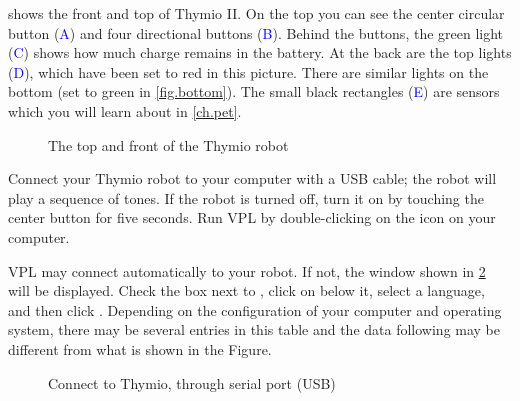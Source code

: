 
\label{ch.intro}


 shows the front and top of Thymio II. On the top you
can see the center circular button (\textcolor{blue}{A}) and four
directional buttons (\textcolor{blue}{B}). Behind the buttons, the green
light (\textcolor{blue}{C}) shows how much charge remains in the
battery. At the back are the top lights (\textcolor{blue}{D}), which
have been set to red in this picture. There are similar lights on the
bottom (set to green in \cref{fig.bottom}). The small black rectangles
(\textcolor{blue}{E}) are sensors which you will learn about in
\cref{ch.pet}.

\begin{figure}[h]
\begin{center}
\caption{The top and front of the Thymio robot}\label{fig.front}
\end{center}
\end{figure}


Connect your Thymio robot to your computer with a USB cable; the robot
will play a sequence of tones. If the robot is turned off, turn it on by
touching the center button for five seconds. Run VPL by double-clicking
on the icon  on your computer.


VPL may connect automatically to your robot. If not, the window shown in
\cref{fig.connect} will be displayed. Check the box next to ,
click on  below it, select a language, and then click
. Depending on the configuration of your computer and
operating system, there may be several entries in this table and the
data following  may be different from what is shown in
the Figure.


\begin{figure}
\begin{center}
\caption{Connect to Thymio, through serial port (USB)}\label{fig.connect}
\end{center}
\end{figure}

